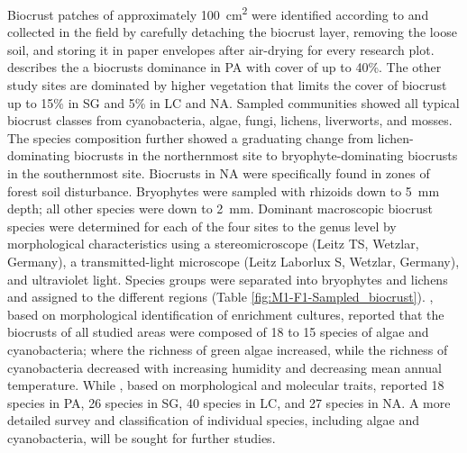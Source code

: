 Biocrust patches of approximately \SI{100}{\square\centi\meter} were identified according to \citet{Lange2016} and collected in the field by carefully detaching the biocrust layer, removing the loose soil, and storing it in paper envelopes after air-drying for every research plot. \citet{Samolov2020} describes the a biocrusts dominance in PA with cover of up to 40\%. The other study sites are dominated by higher vegetation that limits the cover of biocrust up to 15\% in SG and 5\% in LC and NA. Sampled communities showed all typical biocrust classes from cyanobacteria, algae, fungi, lichens, liverworts, and mosses. The species composition further showed a graduating change from lichen-dominating biocrusts in the northernmost site to bryophyte-dominating biocrusts in the southernmost site. Biocrusts in NA were specifically found in zones of forest soil disturbance. Bryophytes were sampled with rhizoids down to \SI{5}{\milli\meter} depth; all other species were down to \SI{2}{\milli\meter}. Dominant macroscopic biocrust species were determined for each of the four sites to the genus level by morphological characteristics using a stereomicroscope (Leitz TS, Wetzlar, Germany), a transmitted-light microscope (Leitz Laborlux S, Wetzlar, Germany), and ultraviolet light. Species groups were separated into bryophytes \citep{Lightowlers1985,He1998,Ochyra2001,Cuvertino2012,Farina2014} and lichens \citep{Galloway2009} and assigned to the different regions (Table \ref{fig:M1-F1-Sampled_biocrust}). \citet{Baumann2018}, based on morphological identification of enrichment cultures, reported that the biocrusts of all studied areas were composed of 18 to 15 species of algae and cyanobacteria; where the richness of green algae increased, while the richness of cyanobacteria decreased with increasing humidity and decreasing mean annual temperature. While \citet{Samolov2020}, based on morphological and molecular traits, reported 18 species in PA, 26 species in SG, 40 species in LC, and 27 species in NA. A more detailed survey and classification of individual species, including algae and cyanobacteria, will be sought for further studies.

